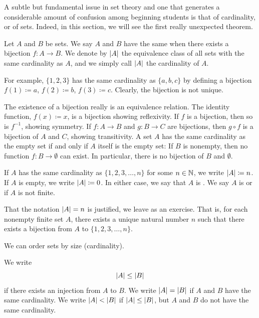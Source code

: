 A subtle but fundamental issue in set theory
and one that generates a considerable amount of
confusion among beginning students is that of cardinality,
or  of sets.
Indeed, in this section, we will see the first really
unexpected theorem.

\begin{defn}
Let $A$ and $B$ be sets.  We say $A$ and $B$ have the same
\emph{}
when there exists a bijection $f \colon A \to B$.  We denote
by $\lvert {A} \rvert$  the equivalence class of all sets with the same cardinality as
$A$, and we simply call $\lvert {A} \rvert$ the cardinality of $A$.
\end{defn}

For example, $\{ 1,2,3 \}$ has the same cardinality as $\{ a,b,c \}$ by
defining a bijection $f(1) \coloneqq a$, $f(2) \coloneqq b$, $f(3) \coloneqq c$.
Clearly, the bijection is not unique.

The existence of a bijection really is an equivalence relation.
The identity function, $f(x) \coloneqq x$, is a bijection showing reflexivity.
If $f$ is a bijection, then so is $f^{-1}$, showing symmetry.
If $f \colon A \to B$ and $g \colon B \to C$ are bijections, then
$g \circ f$ is a bijection of $A$ and $C$, showing transitivity.
A set $A$ has the same cardinality as the empty set if and only
if $A$ itself is the empty set:  If $B$ is nonempty, then
no function $f \colon B \to \emptyset$ can exist.
In particular, there is no bijection of $B$ and $\emptyset$.

\begin{defn}
If $A$ has the same cardinality as $\{ 1,2,3,\ldots,n \}$
for some $n \in {\mathbb{N}}$,
we write $\lvert {A} \rvert \coloneqq n$.  If $A$ is empty, we write
$\lvert {A} \rvert \coloneqq 0$.
In either case, we say that $A$ is
\emph{}.
We say $A$ is \emph{} or 
if $A$ is not finite.
\end{defn}

That the notation $\lvert {A} \rvert = n$ is justified, we leave as an exercise.  That
is, for each nonempty finite set $A$, there exists a unique natural number
$n$ such that there exists a bijection from $A$ to $\{ 1,2,3,\ldots,n \}$.

We can order sets by size (cardinality).

\begin{defn} \label{def:comparecards}
We write
\begin{equation*}
\lvert {A} \rvert \leq \lvert {B} \rvert
\end{equation*}
if there exists an injection from $A$ to $B$.  We write $\lvert {A} \rvert = \lvert {B} \rvert$
if $A$ and $B$ have the same cardinality.  We write $\lvert {A} \rvert < \lvert {B} \rvert$
if $\lvert {A} \rvert \leq \lvert {B} \rvert$, but $A$ and $B$ do not have the same cardinality.
\end{defn}


